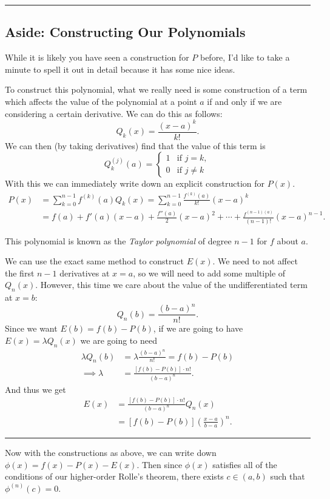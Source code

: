 \documentclass[11pt, a4paper]{article}
\theoremstyle{definition}
\newenvironment{aside}[1]{
	\noindent
    \rule{\textwidth}{0.025cm}
    \vspace{-1.75\baselineskip}
    \subsection*{#1}}
{\noindent\rule{\textwidth}{0.025cm}}
\newcommand{\vocab}[1]{\emph{#1}} %
\begin{document}
\begin{aside}{Aside: Constructing Our Polynomials}

	While it is likely you have seen a construction for $P$ before, I'd like to take a minute to spell it out in detail because it has some nice ideas.

	To construct this polynomial, what we really need is some construction of a term which affects the value of the polynomial at a point $a$ if and only if we are considering a certain derivative. We can do this as follows:
	$$
		Q_{k}(x) = \frac{(x - a)^k}{k!}.
	$$
	We can then (by taking derivatives) find that the value of this term is
	$$
	Q_k^{(j)}(a) = \begin{cases}
        1 &\mbox{if } j = k, \\
        0 &\mbox{if } j \neq k
       \end{cases}
	$$
	With this we can immediately write down an explicit construction for $P(x)$.
	\begin{align*}
		P(x) &= \sum_{k = 0}^{n - 1} f^{(k)}(a) Q_k(x) = \sum_{k = 0}^{n - 1} \frac{f^{(k)}(a)}{k!}(x - a)^k \\
		&= f(a) + f'(a) (x - a) + \frac{f''(a)}{2} (x - a)^2 + \cdots + \frac{f^{(n - 1)(a)}}{(n - 1)!} (x - a)^{n - 1}.
	\end{align*}

	This polynomial is known as the \vocab{Taylor polynomial} of degree $n - 1$ for $f$ about $a$. 

	We can use the exact same method to construct $E(x)$. 
	We need to not affect the first $n - 1$ derivatives at $x = a$, so we will need to add some multiple of $Q_{n}(x)$. However, this time we care about the value of the undifferentiated term at $x = b$:
	$$
	Q_{n}(b) = \frac{(b - a)^n}{n!}.
	$$
	Since we want $E(b) = f(b) - P(b)$, if we are going to have $E(x) = \lambda Q_n(x)$ we are going to need
	\begin{align*}
		\lambda Q_{n}(b) &= \lambda \frac{(b - a)^n}{n!} = f(b) - P(b) \\
\implies \lambda &= \frac{[f(b) - P(b)] \cdot n!}{(b - a)^n}.
	\end{align*}
	And thus we get
	\begin{align*}
		E(x) &= \frac{[f(b) - P(b)] \cdot n!}{(b - a)^n} Q_n(x) \\
		&= \left[f(b) - P(b)\right]\left(\frac{x - a}{b - a}\right)^n.
	\end{align*}
\end{aside}

Now with the constructions as above, we can write down $\phi(x) = f(x) - P(x) - E(x)$.
Then since $\phi(x)$ satisfies all of the conditions of our higher-order Rolle's theorem, there exists $c \in (a, b)$ such that $\phi^{(n)}(c) = 0$. 
\end{document}
